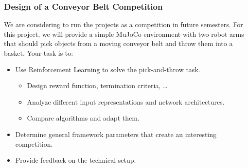 \documentclass[a4paper]{article}
\begin{document}

\subsubsection{Design of a Conveyor Belt Competition}
We are considering to run the projects as a competition in future semesters.
For this project, we will provide a simple MuJoCo environment with two robot arms that should pick objects from a moving conveyor belt and throw them into a basket.
Your task is to:
\begin{itemize}
  \item Use Reinforcement Learning to solve the pick-and-throw task.
  \begin{itemize}
    \item Design reward function, termination criteria, \dots
    \item Analyze different input representations and network architectures.
    \item Compare algorithms and adapt them.
  \end{itemize}
  \item Determine general framework parameters that create an interesting competition.
  \item Provide feedback on the technical setup.
\end{itemize} 




\end{document}
